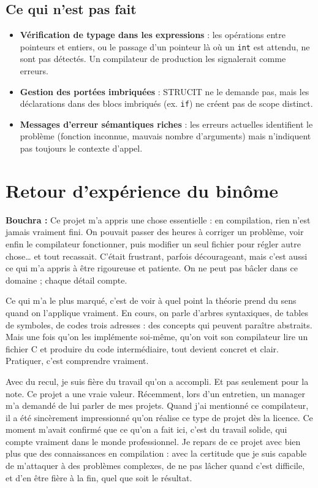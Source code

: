 \documentclass[12pt,a4paper]{article}
\begin{document}
\subsection{Ce qui n'est pas fait}

\begin{itemize}
  \item \textbf{Vérification de typage dans les expressions} : les opérations entre pointeurs et entiers, ou le passage d'un pointeur là où un \texttt{int} est attendu, ne sont pas détectés. Un compilateur de production les signalerait comme erreurs.
  \item \textbf{Gestion des portées imbriquées} : STRUCIT ne le demande pas, mais les déclarations dans des blocs imbriqués (ex. \texttt{if}) ne créent pas de scope distinct.
  \item \textbf{Messages d'erreur sémantiques riches} : les erreurs actuelles identifient le problème (fonction inconnue, mauvais nombre d'arguments) mais n'indiquent pas toujours le contexte d'appel.
\end{itemize}

\section{Retour d'expérience du binôme}

\textbf{Bouchra :} Ce projet m'a appris une chose essentielle : en compilation, rien n'est jamais vraiment fini. On pouvait passer des heures à corriger un problème, voir enfin le compilateur fonctionner, puis modifier un seul fichier pour régler autre chose… et tout recassait. C'était frustrant, parfois décourageant, mais c'est aussi ce qui m'a appris à être rigoureuse et patiente. On ne peut pas bâcler dans ce domaine ; chaque détail compte.

Ce qui m'a le plus marqué, c'est de voir à quel point la théorie prend du sens quand on l'applique vraiment. En cours, on parle d'arbres syntaxiques, de tables de symboles, de codes trois adresses : des concepts qui peuvent paraître abstraits. Mais une fois qu'on les implémente soi-même, qu'on voit son compilateur lire un fichier C et produire du code intermédiaire, tout devient concret et clair. Pratiquer, c'est comprendre vraiment.

Avec du recul, je suis fière du travail qu'on a accompli. Et pas seulement pour la note. Ce projet a une vraie valeur. Récemment, lors d'un entretien, un manager m'a demandé de lui parler de mes projets. Quand j'ai mentionné ce compilateur, il a été sincèrement impressionné qu'on réalise ce type de projet dès la licence. Ce moment m'avait confirmé que ce qu'on a fait ici, c'est du travail solide, qui compte vraiment dans le monde professionnel. Je repars de ce projet avec bien plus que des connaissances en compilation : avec la certitude que je suis capable de m'attaquer à des problèmes complexes, de ne pas lâcher quand c'est difficile, et d'en être fière à la fin, quel que soit le résultat.
\end{document}
